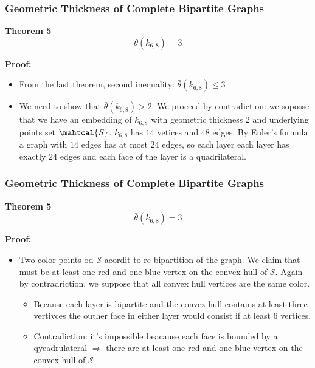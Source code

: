 \documentclass[12 pt]{beamer}
\begin{document}
\begin{frame}{}
    \frametitle{Geometric Thickness of Complete Bipartite Graphs}
    
    \begin{block}{\textbf{Theorem 5}}
    $$\bar{\theta} (k_{6,8}) = 3$$
    \end{block}
    
    \pause
    
    \textbf{Proof:}
    
    \begin{itemize}
    \item From the last theorem, second inequality: $\bar{\theta} (k_{6,8}) \leq 3$
    \item <2-> We need to show that $\bar{\theta} (k_{6,8}) > 2$. We proceed by contradiction: we soposse that we have an embedding of $k_{6,8}$ with geometric thickness $2$ and underlying points set $\mahtcal{S}$.
    $k_{6,8}$ has $14$ vetices and $48$ edges. By Euler's formula a graph with $14$ edges has at most $24$ edges, so each layer each layer has exactly $24$ edges and each face of the layer is a quadrilateral.
    \end{itemize}
    \end{frame}

\begin{frame}{}
    \frametitle{Geometric Thickness of Complete Bipartite Graphs}
    
    \begin{block}{\textbf{Theorem 5}}
    $$\bar{\theta} (k_{6,8}) = 3$$
    \end{block}
    
    \textbf{Proof:}
    
    \begin{itemize}
    \item Two-color points od $\mathcal{S}$ acordit to re bipartition of the graph. We claim that must be at least one red and one blue vertex on the convex hull of $\mathcal{S}$. Again by contradriction, we suppose that all convex hull vertices are the same color.
    
        \begin{itemize}
            \item Because each layer is bipartite and the convez hull contains at least three vertivces the outher face in either layer would consist if at least 6 vertices.
            \item Contradiction: it's impossible beacause each face is bounded by a qyeadrulateral $\Rightarrow$ there are at least one red and one blue vertex on the convex hull of $\mathcal{S}$
        \end{itemize}
    \end{itemize}
\end{frame}
    
\end{document}
